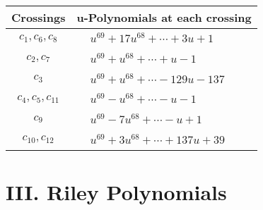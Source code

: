 \documentclass[1p]{elsarticle_modified}
\theoremstyle{definition}
\begin{document}
\begin{tabular}{m{50pt}|m{274pt}}
Crossings & \hspace{64pt}u-Polynomials at each crossing \\
\hline $$\begin{aligned}c_{1},c_{6},c_{8}\end{aligned}$$&$\begin{aligned}
&u^{69}+17 u^{68}+\cdots+3 u+1
\end{aligned}$\\
\hline $$\begin{aligned}c_{2},c_{7}\end{aligned}$$&$\begin{aligned}
&u^{69}+u^{68}+\cdots+u-1
\end{aligned}$\\
\hline $$\begin{aligned}c_{3}\end{aligned}$$&$\begin{aligned}
&u^{69}+u^{68}+\cdots-129 u-137
\end{aligned}$\\
\hline $$\begin{aligned}c_{4},c_{5},c_{11}\end{aligned}$$&$\begin{aligned}
&u^{69}- u^{68}+\cdots- u-1
\end{aligned}$\\
\hline $$\begin{aligned}c_{9}\end{aligned}$$&$\begin{aligned}
&u^{69}-7 u^{68}+\cdots- u+1
\end{aligned}$\\
\hline $$\begin{aligned}c_{10},c_{12}\end{aligned}$$&$\begin{aligned}
&u^{69}+3 u^{68}+\cdots+137 u+39
\end{aligned}$\\
\hline
\end{tabular}\newpage\renewcommand{\arraystretch}{1}
\centering \section*{ III. Riley Polynomials}
\end{document}
